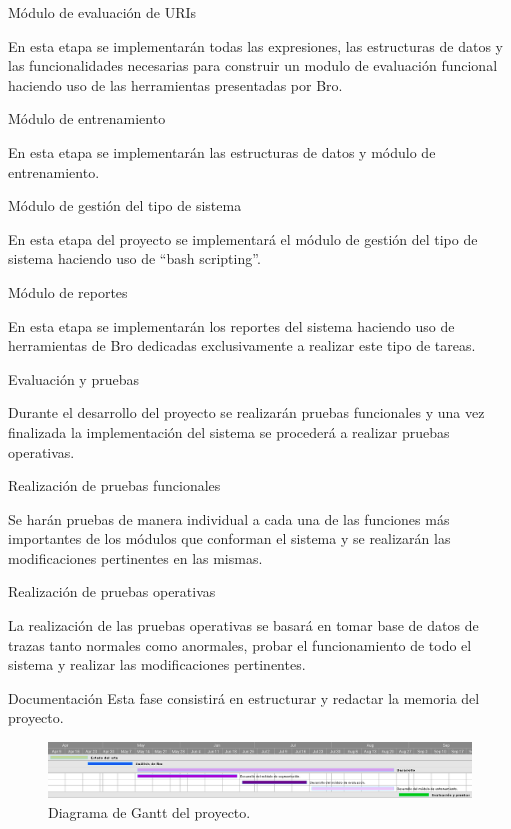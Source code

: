 \begin{legal}
\begin{legal}
\item Módulo de evaluación de URIs 

En esta etapa  se implementarán todas las expresiones, las estructuras de datos y las funcionalidades necesarias para construir un modulo de evaluación funcional haciendo uso de las herramientas presentadas por Bro. 

\item Módulo de entrenamiento 

En esta etapa se implementarán las estructuras de datos y módulo de entrenamiento.

\item Módulo de gestión del tipo de sistema

En esta etapa del proyecto se implementará el módulo de gestión del tipo de sistema haciendo uso de ``bash scripting''. 

\item Módulo de reportes

En esta etapa se implementarán los reportes del sistema haciendo uso de herramientas de Bro dedicadas exclusivamente a realizar este tipo de tareas.

\end{legal}
\item Evaluación y pruebas 

Durante el desarrollo del proyecto se realizarán pruebas funcionales y una vez finalizada la implementación del sistema se procederá a realizar pruebas operativas.
\begin{legal}
\item Realización de pruebas funcionales

Se harán pruebas de manera individual a cada una de las funciones más importantes de los módulos que conforman el sistema y se realizarán las modificaciones pertinentes en las mismas.

\item Realización de pruebas operativas

La realización de las pruebas operativas se basará en tomar base de datos de trazas tanto normales como anormales, probar el funcionamiento de todo el sistema y realizar las modificaciones pertinentes.

\end{legal}

\item Documentación  
 Esta fase consistirá en estructurar y redactar la memoria del proyecto.
\end{legal}

\begin{figure}[tb]
\begin{center}
\includegraphics[width=6in]{./img/pasantia.png}
\caption{Diagrama de Gantt del proyecto.}\label{fig1}
\end{center}
\end{figure}
